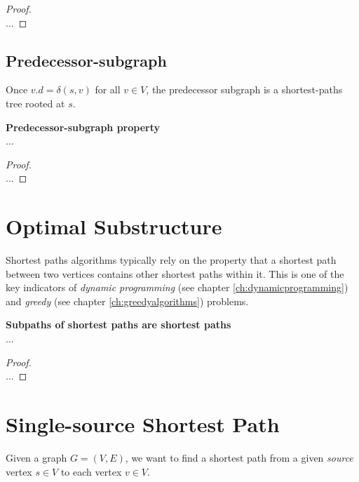 \begin{proof} \textnormal{\cite[p.~?, thm. 24.15]{clrs}} \\
	...
\end{proof}

\subsection{Predecessor-subgraph}
Once $v.d = \delta(s, v)$ for all $v \in V$, the predecessor subgraph is a
shortest-paths tree rooted at $s$.
\begin{lemma}
	\textbf{Predecessor-subgraph property} \\
	...
\end{lemma}

\begin{proof} \textnormal{\cite[p.~?, thm. 24.16]{clrs}} \\
	...
\end{proof}

\newpage
\section{Optimal Substructure}
Shortest paths algorithms typically rely on the property that a shortest path
between two vertices contains other shortest paths within it. This is one of
the key indicators of \textit{dynamic programming} (see chapter
\ref{ch:dynamicprogramming}) and \textit{greedy} (see chapter
\ref{ch:greedyalgorithms}) problems.

\begin{lemma}
	\textbf{Subpaths of shortest paths are shortest paths} \\
	...
\end{lemma} 

\begin{proof} \textnormal{\cite[p.~645, thm.~24.1]{clrs}} \\
	...
\end{proof}

\section{Single-source Shortest Path}
Given a graph $G = (V, E)$, we want to find a shortest path from a given
\textit{source} vertex $s \in V$ to each vertex $v \in V$.

